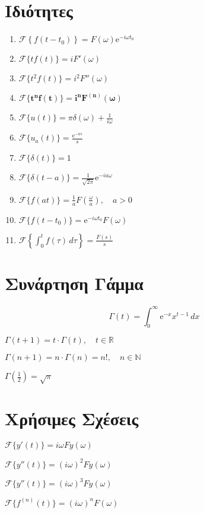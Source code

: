 {  \section*{Ιδιότητες}
  \begin{enumerate}
    \item $ \mathcal{F}\left\{f(t-t_{0})\right\}=F(\omega)\mathrm{e}^{-i\omega t_{0}} $
    \item $ \mathcal{F}\{tf(t)\} = i F'(\omega) $
    \item $ \mathcal{F}\{t^{2}f(t)\} = i^{2} F''(\omega) $
    \item $ \bm{\mathcal{F}\{t^{n}f(t)\} = i^{n} F^{(n)}(\omega)} $
    \item $ \mathcal{F}\{u(t)\} = \pi \delta (\omega) + \frac{1}{i\omega} $
    \item $ \mathcal{F}\{u_{a}(t)\} = \frac{\mathrm{e}^{-as}}{s}$
    \item $ \mathcal{F}\{\delta(t)\} = 1 $
    \item $ \mathcal{F}\{\delta(t-a)\}=\frac{1}{\sqrt{2 \pi}} \mathrm{e}^{-ia \omega}  $
    \item $ \mathcal{F}\{f(at)\}=\frac{1}{a} F\left(\frac{\omega}{a}\right), \quad a>0 $
    \item $ \mathcal{F}\{f(t-t_{0})\} = \mathrm{e}^{-i \omega t_{0}} F(\omega) $
    \item $ \mathcal{F}\left\{\int\nolimits _{0}^{t} f(\tau) \,{d\tau}\right\} = 
      \frac{F(s)}{s} $
\end{enumerate}

  \section*{Συνάρτηση Γάμμα}
  \[
    \boxed{\Gamma (t) = \int _{0}^{\infty} \mathrm{e}^{-x} x^{t-1} \,{dx}}
  \] 
  \begin{myitemize}
    \item $\Gamma (t+1) = t \cdot \Gamma (t), \quad t \in \mathbb{R} $
    \item $\Gamma (n+1) = n \cdot \Gamma (n) = n!, \quad n \in \mathbb{N}$
    \item $\Gamma \left(\frac{1}{2}\right) = \sqrt{\pi}$
  \end{myitemize}
}

\section*{Χρήσιμες Σχέσεις}
\centering
\begin{myitemize}
  \item $ \mathcal{F}\{y'(t)\} = i\omega F{y} (\omega) $
  \item $ \mathcal{F}\{y''(t)\} = (i\omega)^{2} F{y}(\omega) $
  \item $ \mathcal{F}\{y''(t)\} = (i\omega)^{3} F{y}(\omega) $
  \item $ \mathcal{F}\{f^{(n)}(t)\} = (i\omega)^{n} F(\omega) $
\end{myitemize}




